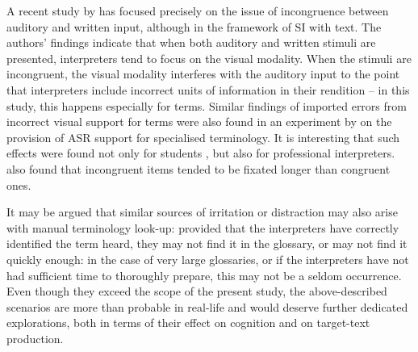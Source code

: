A recent study by \citet{chmiel_multimodal_2020} has focused precisely on the issue of incongruence between auditory and written input, although in the framework of SI with text. The authors' findings indicate that when both auditory and written stimuli are presented, interpreters tend to focus on the visual modality. When the stimuli are incongruent, the visual modality interferes with the auditory input to the point that interpreters include incorrect units of information in their rendition – in this study, this happens especially for terms. Similar findings of imported errors from incorrect visual support for terms were also found in an experiment by \citet{van_cauwenberghe_etude_2020} on the provision of ASR support for specialised terminology. It is interesting that such effects were found not only for students \citep{van_cauwenberghe_etude_2020}, but also for professional interpreters. \citet{chmiel_multimodal_2020} also found that incongruent items tended to be fixated longer than congruent ones.

It may be argued that similar sources of irritation or distraction may also arise with manual terminology look-up: provided that the interpreters have correctly identified the term heard, they may not find it in the glossary, or may not find it quickly enough: in the case of very large glossaries, or if the interpreters have not had sufficient time to thoroughly prepare, this may not be a seldom occurrence. Even though they exceed the scope of the present study, the above-described scenarios are more than probable in real-life and would deserve further dedicated explorations, both in terms of their effect on cognition and on target-text production.
